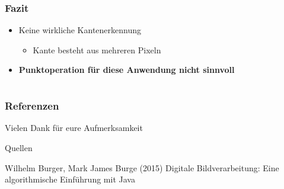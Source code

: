 \documentclass[12pt]{beamer}
\begin{document}
\begin{frame}
	\frametitle{Fazit}
	\begin{itemize}
		\item Keine wirkliche Kantenerkennung 
		\begin{itemize}
			\item Kante besteht aus mehreren Pixeln
		\end{itemize}
		\item \textbf{Punktoperation für diese Anwendung nicht sinnvoll}		
	\end{itemize}
\end{frame}

\section*{}

\begin{frame}
	\frametitle{Referenzen}
	\Large{Vielen Dank für eure Aufmerksamkeit}	
	\newline
	\begin{block}{Quellen}
		\small{	
		\begin{thebibliography}{99} %
			 Wilhelm Burger, Mark James Burge (2015)
			\newblock Digitale Bildverarbeitung: Eine algorithmische Einführung mit Java
		\end{thebibliography}
		}
	\end{block}
\end{frame}
\end{document}
